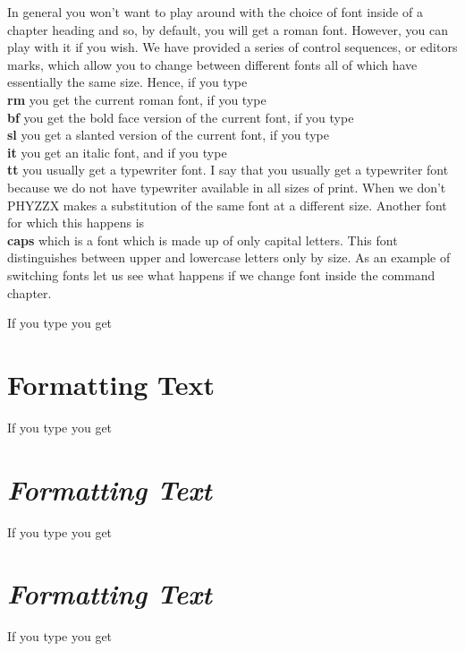 In general you won't want to play around with the choice of font
inside of a chapter heading and so, by default, you will
get a roman font.
However, you can play with it if you wish.
We have provided a series of control sequences, or editors marks,
which allow you to change between different fonts all of which
have essentially the same size.
Hence, if you type {\bf \\rm} you get the current roman font,
if you type {\bf \\bf} you get the bold face version of the current font,
if you type {\bf \\sl} you get a slanted version of the current font,
if you type {\bf \\it} you get an italic font, and if
you type {\bf \\tt} you usually get a typewriter font.
I say that you usually get a typewriter font because we do not
have typewriter available in all sizes of print.
When we don't PHYZZX makes a substitution of the same font at a different
size.
Another font for which this happens is {\bf \\caps} which is
a font \endpage \noindent which is made up of only capital letters.
This font distinguishes between upper and lowercase letters only by size.
As an example of switching fonts let us see what happens if we change
font inside the command chapter.
 
If you type \recallchap
{}
you get
\chapter{\bf Formatting Text}
If you type \recallchap
{}
you get
\chapter{\sl Formatting Text}
If you type \recallchap
{}
you get
\chapter{\it Formatting Text}
\endpage
If you type \recallchap
{}
you get
